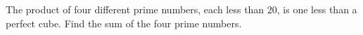 The product of four different prime numbers, each less than $20$, is one less than a perfect cube. Find the sum of the four prime numbers.
